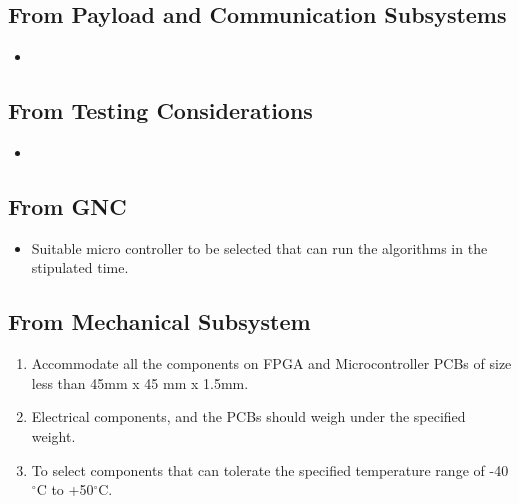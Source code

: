 \documentclass[../../main.tex]{subfiles}
\begin{document}
\subsection{From Payload and Communication Subsystems}
\begin{itemize}
    \item 
\end{itemize}
\subsection{From Testing Considerations}
\begin{itemize}
    \item 
\end{itemize}
\subsection{From GNC}
\begin{itemize}
    \item Suitable micro controller to be selected that can run the algorithms in the stipulated time.
    
\end{itemize}
\subsection{From Mechanical Subsystem}
 \begin{enumerate}
    \item Accommodate all the components on FPGA and Microcontroller PCBs of size less than 45mm x 45 mm x 1.5mm.
    \item Electrical components, and the PCBs should weigh under the specified weight.
    \item To select components that can tolerate the specified temperature range of -40$^\circ$C to +50$^\circ$C.
   \end{enumerate}
\end{document}
